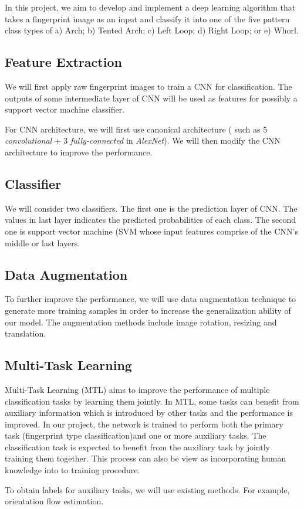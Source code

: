 
In this project, we aim to develop and implement a deep learning algorithm that takes a fingerprint image as an input and classify it into one of the five pattern class types of a) Arch; b) Tented Arch; c) Left Loop; d) Right Loop; or e) Whorl. 

\subsection{Feature Extraction}
%
We will first apply raw fingerprint images to train a CNN for classification. The outputs of some intermediate layer of CNN will be used as features for possibly a support vector machine classifier.

For CNN architecture, we will first use canonical architecture ( such as 5 \textit{convolutional} + 3 \textit{fully-connected} in \textit{AlexNet}\cite{krizhevsky2012imagenet}).
%
We will then modify the CNN architecture to improve the performance.
%
\subsection{Classifier}
%
We will consider two classifiers. The first one is the prediction layer of CNN. The values in last layer indicates the predicted probabilities of each class.
%
The second one is support vector machine (SVM whose input features comprise of the CNN’s middle or last layers.

\subsection{Data Augmentation}

%
To further improve the performance, we will use data augmentation technique to generate more training samples in order to increase the generalization ability of our model. 
%
The augmentation methods include image rotation, resizing and translation.

\subsection{Multi-Task Learning}

Multi-Task Learning (MTL)\cite{caruana1998multitask} aims to improve the performance of multiple classification tasks by learning them jointly.
%
In MTL, some tasks can benefit from auxiliary information which is introduced by other tasks and the performance is improved\cite{zhang2016learning}.
%
In our project, the network is trained to perform both the primary task (fingerprint type classification)and one or more auxiliary tasks. 
%
The classification task is expected to benefit from the auxiliary task by jointly training them together.
%
This process can also be view as incorporating human knowledge into to training procedure.

To obtain labels for auxiliary tasks, we will use existing methods. For example, orientation flow estimation\cite{NFIQ}.
